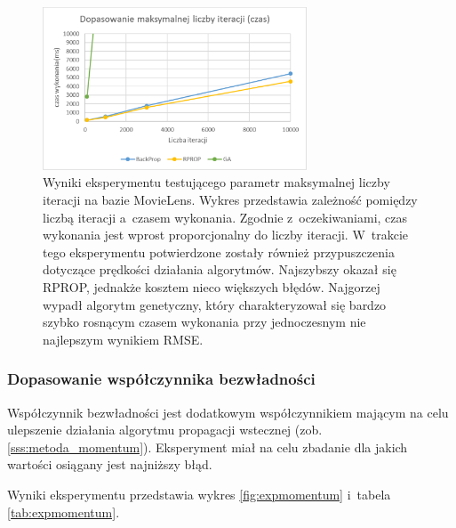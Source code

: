 \documentclass[twoside]{iisthesis}
\begin{document}
				\begin{figure}[!ht]
					\centering
					\includegraphics[width=0.7\textwidth]{expiterations_time}			
					\caption{Wyniki eksperymentu testującego parametr maksymalnej liczby iteracji na bazie MovieLens. Wykres przedstawia zależność pomiędzy liczbą iteracji a~czasem wykonania. Zgodnie z~oczekiwaniami, czas wykonania jest wprost proporcjonalny do liczby iteracji. W~trakcie tego eksperymentu potwierdzone zostały również przypuszczenia dotyczące prędkości działania algorytmów. Najszybszy okazał się RPROP, jednakże kosztem nieco większych błędów. Najgorzej wypadł algorytm genetyczny, który charakteryzował się bardzo szybko rosnącym czasem wykonania przy jednoczesnym nie najlepszym wynikiem RMSE. }
					\label{fig:expiterations_time}
				\end{figure}
					
			\subsubsection{Dopasowanie współczynnika bezwładności} 
			\label{exp:momentum}
				
			Współczynnik bezwładności jest dodatkowym współczynnikiem mającym na celu ulepszenie działania algorytmu propagacji wstecznej (zob. \ref{sss:metoda_momentum}). Eksperyment miał na celu zbadanie dla jakich wartości osiągany jest najniższy błąd.
			
			Wyniki eksperymentu przedstawia wykres \ref{fig:expmomentum} i~tabela \ref{tab:expmomentum}. 
				
\end{document}
